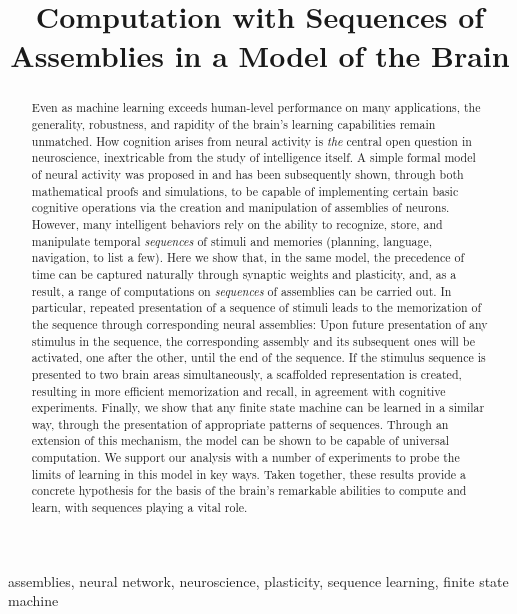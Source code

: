 \documentclass[12pt,nosubfloats]{alt2024} %
\title[Computation with Sequences in the Brain]{Computation with Sequences of Assemblies in a Model of the Brain}
\newcommand{\1}{\mathbbm{1}}
\begin{document}
\maketitle

\begin{abstract}%
Even as machine learning exceeds human-level performance on many applications, the generality, robustness, and rapidity of the brain's learning capabilities remain unmatched. How cognition arises from neural activity is {\em the} central open question in neuroscience, inextricable from the study of intelligence itself. A simple formal model of neural activity was proposed in \citet{papadimitriou2020brain} and has been subsequently shown, through both mathematical proofs and simulations, to be capable of implementing certain basic cognitive operations via the creation and manipulation of assemblies of neurons. However, many intelligent behaviors rely on the ability to recognize, store, and manipulate temporal {\em sequences} of stimuli and memories (planning, language, navigation, to list a few). Here we show that, in the same model, the precedence of time can be captured naturally through synaptic weights and plasticity, and, as a result, a range of computations on {\em sequences} of assemblies can be carried out.  In particular, repeated presentation of a sequence of stimuli leads to the memorization of the sequence through corresponding neural assemblies: Upon future presentation of any stimulus in the sequence, the corresponding assembly and its subsequent ones will be activated, one after the other, until the end of the sequence.  If the stimulus sequence is presented to two brain areas simultaneously, a scaffolded representation is created, resulting in more efficient memorization and recall, in agreement with cognitive experiments. Finally, we show that any finite state machine can be learned in a similar way, through the presentation of appropriate patterns of sequences.  Through an extension of this mechanism, the model can be shown to be capable of universal computation. We support our analysis with a number of experiments to probe the limits of learning in this model in key ways. Taken together, these results provide a concrete hypothesis for the basis of the brain's remarkable abilities to compute and learn, with sequences playing a vital role.
\end{abstract}

\begin{keywords}%
  assemblies, neural network, neuroscience, plasticity, sequence learning, finite state machine
\end{keywords}
\end{document}
